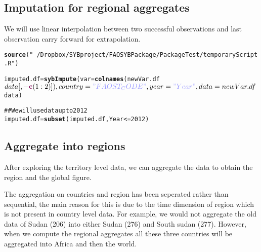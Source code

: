 \documentclass{article}\usepackage{graphicx, color}
\makeatletter
\newcommand{\hlfunctioncall}[1]{\textcolor[rgb]{0.501960784313725,0,0.329411764705882}{\textbf{#1}}}%
\newcommand{\hlstring}[1]{\textcolor[rgb]{0.6,0.6,1}{#1}}%
\newcommand{\hlcomment}[1]{\textcolor[rgb]{0.180392156862745,0.6,0.341176470588235}{#1}}%
\newenvironment{kframe}{%
 \def\at@end@of@kframe{}%
 \ifinner\ifhmode%
  \def\at@end@of@kframe{\end{minipage}}%
  \begin{minipage}{\columnwidth}%
 \fi\fi%
 \def\FrameCommand##1{\hskip\@totalleftmargin \hskip-\fboxsep
 \colorbox{shadecolor}{##1}\hskip-\fboxsep
     \hskip-\linewidth \hskip-\@totalleftmargin \hskip\columnwidth}%
 \MakeFramed {\advance\hsize-\width
   \@totalleftmargin\z@ \linewidth\hsize
   \@setminipage}}%
 {\par\unskip\endMakeFramed%
 \at@end@of@kframe}
\newenvironment{knitrout}{}{} %
\makeatother
\begin{document}

\subsection{Imputation for regional aggregates}
We will use linear interpolation between two successful observations
and last observation carry forward for extrapolation.
\begin{knitrout}
\color{fgcolor}\begin{kframe}
\begin{alltt}
\hlfunctioncall{source}(\hlstring{"~/Dropbox/SYBproject/FAOSYB Package/Package Test/temporaryScript.R"})
\end{alltt}


{\ttfamily\noindent\bfseries\color{errorcolor}{\#\# Error: cannot open the connection}}\begin{alltt}
imputed.df = \hlfunctioncall{sybImpute}(var = \hlfunctioncall{colnames}(newVar.df$data[, -\hlfunctioncall{c}(1:2)]),
    country = \hlstring{"FAOST_CODE"}, year = \hlstring{"Year"}, data = newVar.df$data)
\end{alltt}


{\ttfamily\noindent\bfseries\color{errorcolor}{\#\# Error: could not find function "sybImpute"}}\begin{alltt}

\hlcomment{## We will use data up to 2012}
imputed.df = \hlfunctioncall{subset}(imputed.df, Year <= 2012)
\end{alltt}


{\ttfamily\noindent\bfseries\color{errorcolor}{\#\# Error: object 'imputed.df' not found}}\end{kframe}
\end{knitrout}


\subsection{Aggregate into regions}
After exploring the territory level data, we can aggregate the data to
obtain the region and the global figure.

The aggregation on countries and region has been seperated rather than
sequential, the main reason for this is due to the time dimension of
region which is not present in country level data. For example, we
would not aggregate the old data of Sudan (206) into either Sudan
(276) and South sudan (277). However, when we compute the regional
aggregates all these three countries will be aggregated into Africa
and then the world.
\end{document}
